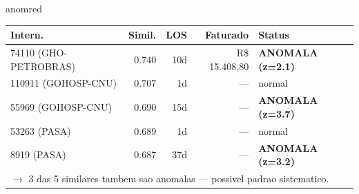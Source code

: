 \documentclass[a4paper,10pt]{article}
\begin{document}
\begin{anomalycard}[Internacao 163846 | GHO-PETROBRAS | CRITICO (z=5.07)]{anomred}
\begin{tabular}{l r r r l}\toprule\textbf{Intern.} & \textbf{Simil.} & \textbf{LOS} & \textbf{Faturado} & \textbf{Status} \\\midrule
74110 (GHO-PETROBRAS) & 0.740 & 10d & R\$ 15.408,80 & \textcolor{anomred}{\textbf{ANOMALA (z=2.1)}} \\
110911 (GOHOSP-CNU) & 0.707 & 1d & --- & \textcolor{jcubeblue}{normal} \\
55969 (GOHOSP-CNU) & 0.690 & 15d & --- & \textcolor{anomred}{\textbf{ANOMALA (z=3.7)}} \\
53263 (PASA) & 0.689 & 1d & --- & \textcolor{jcubeblue}{normal} \\
8919 (PASA) & 0.687 & 37d & --- & \textcolor{anomred}{\textbf{ANOMALA (z=3.2)}} \\
\multicolumn{5}{l}{\textcolor{anomred}{\small $\rightarrow$ 3 das 5 similares tambem sao anomalas --- possivel padrao sistematico.}} \\
\bottomrule\end{tabular}


\end{anomalycard}

\newpage
\end{document}
